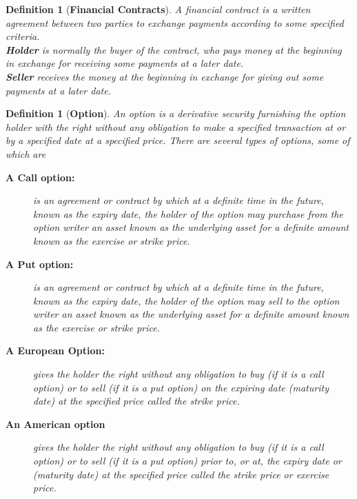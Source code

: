 \documentclass[a4 paper, 12pt]{report}
\theoremstyle{plain}
\newtheorem{definition}[theorem]{\textbf{Definition}}
\begin{document}
\begin{definition}[\textbf{Financial Contracts}]\label{125}
\normalfont
A financial contract is a written agreement between two parties to exchange payments according to some specified criteria.\\
\textbf{Holder} is normally the buyer of the contract, who pays money at the beginning in exchange for receiving some payments at a later date.\\
\textbf{Seller} receives the money at the beginning in exchange for giving out some payments at a later date.
\end{definition}

\begin{definition}[\textbf{Option}]\label{126}
\normalfont
An option is a derivative security furnishing the option holder with the right without any obligation to make a specified transaction at or by a specified date at a specified price. There are several types of options, some of which are
\begin{description}
\item[\textbf{A Call option:}] is an agreement or contract by which at a definite time in the future, known as the expiry date, the holder of the option may purchase from the option writer an asset known as the underlying asset for a definite amount known as the exercise or strike price.
\item[\textbf{A Put option:}] is an agreement or contract by which at a definite time in the future, known as the expiry date, the holder of the option may sell to the option writer an asset known as the underlying asset for a definite amount known as the exercise or strike price.
\item[\textbf{A European Option:}] gives the holder the right without any obligation to buy (if it is a call option) or to sell (if it is a put option) on the expiring date (maturity date) at the specified price called the strike price.
\item[\textbf{An American option}] gives the holder the right without any obligation to buy (if it is a call option) or to sell (if it is a put option) prior to, or at, the expiry date or (maturity date) at the specified price called the strike price or exercise price.
\end{description}
\end{definition}
\end{document}
